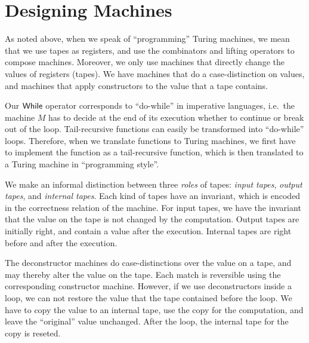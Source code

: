 \section{Designing Machines}
\label{sec:programming-design}
%

As noted above, when we speak of ``programming'' Turing machines, we mean that we use tapes as registers, and use the combinators and lifting
operators to compose machines.  Moreover, we only use machines that directly change the values of registers (tapes).  We have machines that do a
case-distinction on values, and machines that apply constructors to the value that a tape contains.

Our $\mathsf{While}$ operator corresponds to ``do-while'' in imperative languages, i.e.\ the machine $M$ has to decide at the end of its execution whether to
continue or break out of the loop.  Tail-recursive functions can easily be transformed into ``do-while'' loops.  Therefore, when we translate
functions to Turing machines, we first have to implement the function as a tail-recursive function, which is then translated to a Turing machine in
``programming style''.


We make an informal distinction between three \textit{roles} of tapes: \textit{input tapes}, \textit{output tapes}, and \textit{internal tapes}.  Each
kind of tapes have an invariant, which is encoded in the correctness relation of the machine.  For input tapes, we have the invariant that the value
on the tape is not changed by the computation.  Output tapes are initially right, and contain a value after the execution.  Internal tapes are right
before and after the execution.

The deconstructor machines do case-distinctions over the value on a tape, and may thereby alter the value on the tape.  Each match is reversible using
the corresponding constructor machine.  However, if we use deconstructors inside a loop, we can not restore the value that the tape contained before
the loop.  We have to copy the value to an internal tape, use the copy for the computation, and leave the ``original'' value unchanged.  After the
loop, the internal tape for the copy is reseted.


